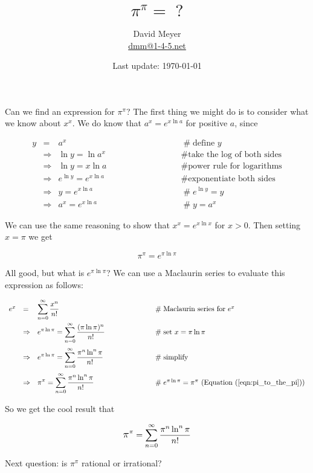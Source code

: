 \documentclass[14pt, oneside]{article}
\title{{\Huge $\pi^\pi = \; ?$}}
\author{David Meyer \\ \href{mailto:dmm@1-4-5.net}{dmm@1-4-5.net}}
\date{Last update: \today}
\begin{document}
\maketitle

\large
\noindent
Can we find an expression for $\pi^\pi$? The first thing 
we might do is to consider what we know about $x^x$. We 
do know that $a^x = e^{x \ln a}$ for positive $a$, since

\medskip
\begin{equation*}
\begin{array}{llll}
y
&=& a^x											&\qquad \qquad \qquad \qquad \mathrel{\#} \text{define $y$} \\
[10pt]
&\Rightarrow& \ln y = \ln a^x					&\qquad \qquad \qquad \qquad \mathrel{\#} \text{take the log of both sides} \\
[10pt]
&\Rightarrow& \ln y = x \ln a 					&\qquad \qquad \qquad \qquad \mathrel{\#} \text{power rule for logarithms} \\
[10pt]
&\Rightarrow& e^{\ln y} = e^{x \ln a}			&\qquad \qquad \qquad \qquad \mathrel{\#} \text{exponentiate both sides} \\
[10pt]
&\Rightarrow& y = e^{x \ln a}					&\qquad \qquad \qquad \qquad \mathrel{\#} e^{\ln y} = y \\
[10pt]
&\Rightarrow& a^x = e^{x \ln a}					&\qquad \qquad \qquad \qquad \mathrel{\#} y = a^x
\end{array}
\end{equation*}

\smallskip
\bigskip
\noindent
We can use the same reasoning to show that $x^x = e^{x \ln
x}$ for $x > 0$. Then setting $x = \pi$ we get

{\Large
\begin{equation}
{\displaystyle \pi^{\pi} = e^{\pi \ln \pi}}
\label{eqn:pi_to_the_pi}
\end{equation}}

\noindent
All good, but what is $e^{\pi \ln \pi}$? We can use a Maclaurin
series to evaluate this expression as follows:

\medskip
\begin{equation*}
\begin{array}{llll}
e^x
&=& {\displaystyle \sum\limits_{n=0}^{\infty} \dfrac{x^n}{n!}}
	&\qquad \qquad \qquad \mathrel{\#} \text{Maclaurin series for $e^x$} \\
[12pt]
&\Rightarrow& {\displaystyle e^{\pi \ln \pi} = \sum\limits_{n=0}^{\infty} \dfrac{(\pi \ln\pi)^n}{n!}}	
		&\qquad \qquad \qquad \mathrel{\#} \text{set $x = \pi \ln \pi$} \\
[15pt]
&\Rightarrow& {\displaystyle e^{\pi \ln \pi} =\sum\limits_{n=0}^{\infty} \dfrac{\pi^n \ln^n\pi}{n!}} 		
	&\qquad \qquad \qquad \mathrel{\#} \text{simplify} \\
[15pt]
&\Rightarrow& {\displaystyle \pi^\pi = \sum\limits_{n=0}^{\infty} \dfrac{\pi^n \ln^n\pi}{n!}}													
	&\qquad \qquad \qquad \mathrel{\#} \text{$e^{\pi \ln \pi} = \pi^\pi$ (Equation (\ref{eqn:pi_to_the_pi}))}
 
\end{array}
\end{equation*}


\medskip
\bigskip
\noindent
So we get the cool result that

{\Large
\begin{equation*}
{\mathlarger \pi^\pi = \sum\limits_{n=0}^{\infty} \dfrac{\pi^n \ln^n\pi}{n!}}
\end{equation*}}

\bigskip
\noindent
Next question: is $\pi^\pi$ rational or irrational? 
\end{document}
